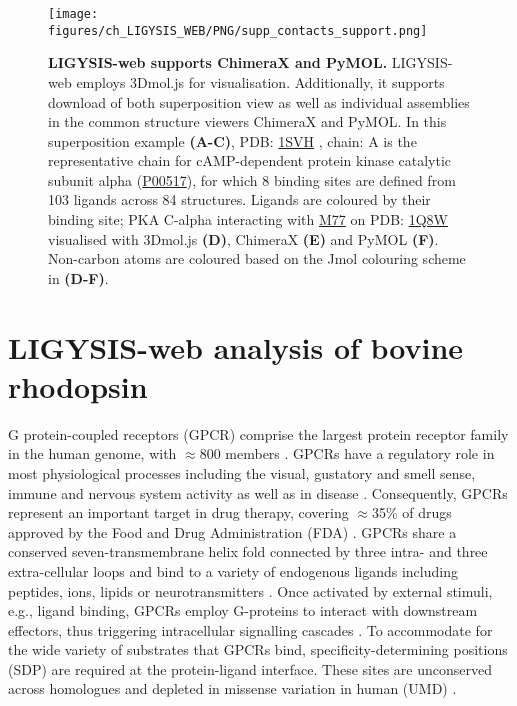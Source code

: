 \begin{figure}[htb!]
    \centering
    \texttt{[image: figures/ch\_LIGYSIS\_WEB/PNG/supp\_contacts\_support.png]}
    \caption[LIGYSIS-web supports ChimeraX and PyMOL]{\textbf{LIGYSIS-web supports ChimeraX and PyMOL.} LIGYSIS-web employs 3Dmol.js for visualisation. Additionally, it supports download of both superposition view as well as individual assemblies in the common structure viewers ChimeraX and PyMOL. In this superposition example \textbf{(A-C)}, PDB: \href{https://www.ebi.ac.uk/pdbe/entry/pdb/1svh}{1SVH} \cite{BREITENLECHNER_2004_PKB}, chain: A is the representative chain for cAMP-dependent protein kinase catalytic subunit alpha (\href{https://www.uniprot.org/uniprotkb/P00517/entry}{P00517}), for which 8 binding sites are defined from 103 ligands across 84 structures. Ligands are coloured by their binding site; PKA C-alpha interacting with \href{https://www.ebi.ac.uk/pdbe-srv/pdbechem/chemicalCompound/show/M77}{M77} on PDB: \href{https://www.ebi.ac.uk/pdbe/entry/pdb/1q8w}{1Q8W} visualised with 3Dmol.js \textbf{(D)}, ChimeraX \textbf{(E)} and PyMOL \textbf{(F)}. Non-carbon atoms are coloured based on the Jmol colouring scheme \cite{JMOL} in \textbf{(D-F)}.}
    \label{fig:supp_suport}
\end{figure}

\section{LIGYSIS-web analysis of bovine rhodopsin}

G protein-coupled receptors (GPCR) comprise the largest protein receptor family in the human genome, with $\approx$800 members \cite{LIU_2024_GPCRs}. GPCRs have a regulatory role in most physiological processes including the visual, gustatory and smell sense, immune and nervous system activity as well as in disease \cite{LATORRACA_2017_GPCRs}. Consequently, GPCRs represent  an important target in drug therapy, covering $\approx$35\% of drugs approved by the Food and Drug Administration (FDA) \cite{HAUSER_2017_GPCRS, INSEL_2019_GPCRs}. GPCRs share a conserved seven-transmembrane helix fold connected by three intra- and three extra-cellular loops \cite{ZHANG_2024_GPCRs} and bind to a variety of endogenous ligands including peptides, ions, lipids or neurotransmitters \cite{ZARZYCKA_2019_GPCRs, MANNES_2022_GPCRs}. Once activated by external stimuli, e.g., ligand binding, GPCRs employ G-proteins to interact with downstream effectors, thus triggering intracellular signalling cascades \cite{CHENG_2023_GPCRs}. To accommodate for the wide variety of substrates that GPCRs bind, specificity-determining positions (SDP) are required at the protein-ligand interface. These sites are unconserved across homologues and depleted in missense variation in human (UMD) \cite{MACGOWAN_2024_VARIANTS}.


